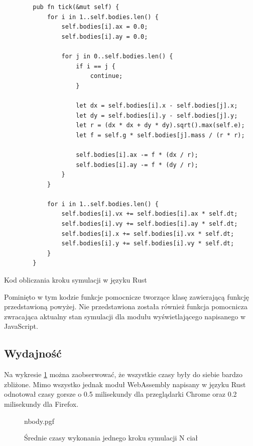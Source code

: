 \documentclass[language=polish,type=master]{aghmodern}
\begin{document}
\begin{listing}[H]
    \begin{verbatim}
        pub fn tick(&mut self) {
            for i in 1..self.bodies.len() {
                self.bodies[i].ax = 0.0;
                self.bodies[i].ay = 0.0;
    
                for j in 0..self.bodies.len() {
                    if i == j {
                        continue;
                    }
    
                    let dx = self.bodies[i].x - self.bodies[j].x;
                    let dy = self.bodies[i].y - self.bodies[j].y;
                    let r = (dx * dx + dy * dy).sqrt().max(self.e);
                    let f = self.g * self.bodies[j].mass / (r * r);
    
                    self.bodies[i].ax -= f * (dx / r);
                    self.bodies[i].ay -= f * (dy / r);
                }
            }
    
            for i in 1..self.bodies.len() {
                self.bodies[i].vx += self.bodies[i].ax * self.dt;
                self.bodies[i].vy += self.bodies[i].ay * self.dt;
                self.bodies[i].x += self.bodies[i].vx * self.dt;
                self.bodies[i].y += self.bodies[i].vy * self.dt;
            }
        }
    \end{verbatim}
    \caption{Kod obliczania kroku symulacji w języku Rust}
\end{listing}

Pominięto w tym kodzie funkcje pomocnicze tworzące klasę zawierającą funkcję przedstawioną powyżej.
Nie przedstawiona została również funkcja pomocnicza zwracająca aktualny stan symulacji dla modułu wyświetlającego napisanego w JavaScript.

\subsection{Wydajność}
Na wykresie \ref{fig:nbody} można zaobserwować, że wszystkie czasy były do siebie bardzo zbliżone.
Mimo wszystko jednak moduł WebAssembly napisany w języku Rust odnotował czasy gorsze o 0.5 milisekundy dla przeglądarki Chrome oraz 0.2 milisekundy dla Firefox.

\begin{figure}[H]
    \centering
    {nbody.pgf}
    \caption{Średnie czasy wykonania jednego kroku symulacji N ciał}
    \label{fig:nbody}
\end{figure}
\end{document}
